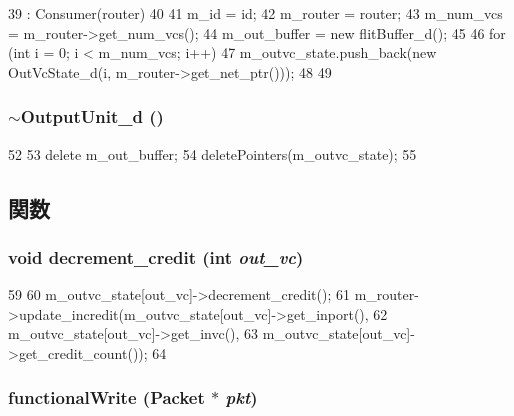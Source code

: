\begin{DoxyCode}
39     : Consumer(router)
40 {
41     m_id = id;
42     m_router = router;
43     m_num_vcs = m_router->get_num_vcs();
44     m_out_buffer = new flitBuffer_d();
45 
46     for (int i = 0; i < m_num_vcs; i++) {
47         m_outvc_state.push_back(new OutVcState_d(i, m_router->get_net_ptr()));
48     }
49 }
\end{DoxyCode}
\hypertarget{classOutputUnit__d_aef13b7a3e31e2a02ebbf47b938369b68}{
\subsubsection[{$\sim$OutputUnit\_\-d}]{\setlength{\rightskip}{0pt plus 5cm}$\sim${\bf OutputUnit\_\-d} ()}}
\label{classOutputUnit__d_aef13b7a3e31e2a02ebbf47b938369b68}



\begin{DoxyCode}
52 {
53     delete m_out_buffer;
54     deletePointers(m_outvc_state);
55 }
\end{DoxyCode}


\subsection{関数}
\hypertarget{classOutputUnit__d_ab998c12ca35652c419fce27547c19c73}{
\subsubsection[{decrement\_\-credit}]{\setlength{\rightskip}{0pt plus 5cm}void decrement\_\-credit (int {\em out\_\-vc})}}
\label{classOutputUnit__d_ab998c12ca35652c419fce27547c19c73}



\begin{DoxyCode}
59 {
60     m_outvc_state[out_vc]->decrement_credit();
61     m_router->update_incredit(m_outvc_state[out_vc]->get_inport(),
62                               m_outvc_state[out_vc]->get_invc(),
63                               m_outvc_state[out_vc]->get_credit_count());
64 }
\end{DoxyCode}
\hypertarget{classOutputUnit__d_ad07b9def1d6f5e5f988a254c3a9d1ad9}{
\subsubsection[{functionalWrite}]{ functionalWrite ({\bf Packet} $\ast$ {\em pkt})}}
\label{classOutputUnit__d_ad07b9def1d6f5e5f988a254c3a9d1ad9}



